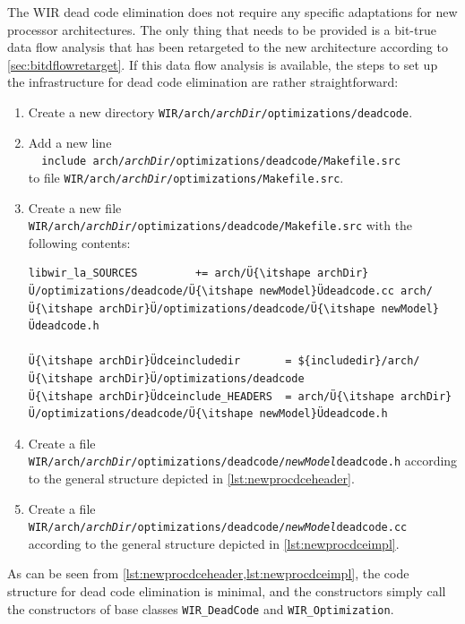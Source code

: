 The \gls{WIR} dead code elimination does not require any specific adaptations for new processor architectures.
The only thing that needs to be provided is a bit-true data flow analysis that has been retargeted to the new architecture according to \cref{sec:bitdflowretarget}.
If this data flow analysis is available, the steps to set up the infrastructure for dead code elimination are rather straightforward:
\begin{enumerate}
  \item Create a new directory \texttt{WIR/arch/{\itshape archDir}/optimizations/deadcode}.

  \item Add a new line \\
  \verb|  include arch/|\texttt{\itshape archDir}\verb|/optimizations/deadcode/Makefile.src| \\
  to file \texttt{WIR/arch/{\itshape archDir}/optimizations/Makefile.src}.

  \item Create a new file \texttt{WIR/arch/{\itshape archDir}/optimizations/deadcode/Makefile.src} with the following contents: \\
\begin{lstlisting}[style=code,float=!ht,xleftmargin=10mm,aboveskip=-0.8 \baselineskip,belowskip=-0.8 \baselineskip]
libwir_la_SOURCES         += arch/Ü{\itshape archDir}Ü/optimizations/deadcode/Ü{\itshape newModel}Üdeadcode.cc arch/Ü{\itshape archDir}Ü/optimizations/deadcode/Ü{\itshape newModel}Üdeadcode.h

Ü{\itshape archDir}Üdceincludedir       = ${includedir}/arch/Ü{\itshape archDir}Ü/optimizations/deadcode
Ü{\itshape archDir}Üdceinclude_HEADERS  = arch/Ü{\itshape archDir}Ü/optimizations/deadcode/Ü{\itshape newModel}Üdeadcode.h
\end{lstlisting}

  \item Create a file \texttt{WIR/arch/{\itshape archDir}/optimizations/deadcode/{\itshape newModel}deadcode.h} according to the general structure depicted in \cref{lst:newprocdceheader}.

  \item Create a file \texttt{WIR/arch/{\itshape archDir}/optimizations/deadcode/{\itshape newModel}deadcode.cc} according to the general structure depicted in \cref{lst:newprocdceimpl}.
\end{enumerate}

As can be seen from \cref{lst:newprocdceheader,lst:newprocdceimpl}, the code structure for dead code elimination is minimal, and the constructors simply call the constructors of base classes \texttt{WIR\_DeadCode} and \texttt{WIR\_Optimization}.

